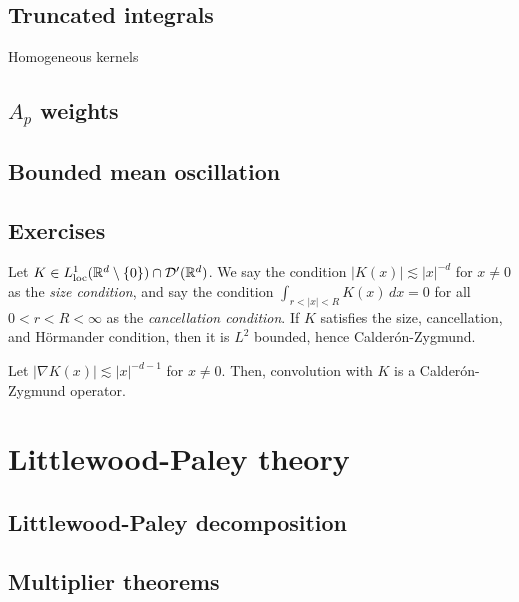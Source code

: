 \documentclass{../../large}
\begin{document}
\begin{prb}
\end{prb}


\section{Truncated integrals}

Homogeneous kernels

\section{$A_p$ weights}

\section{Bounded mean oscillation}


\section*{Exercises}
\begin{prb}
Let $K\in L_{\mathrm{loc}}^1(\mathbb{R}^d\setminus\{0\})\cap\mathcal{D}'(\mathbb{R}^d)$.
We say the condition $|K(x)|\lesssim|x|^{-d}$ for $x\ne0$ as the \emph{size condition}, and say the condition $\int_{r<|x|<R}K(x)\,dx=0$ for all $0<r<R<\infty$ as the \emph{cancellation condition}.
If $K$ satisfies the size, cancellation, and H\"ormander condition, then it is $L^2$ bounded, hence Calder\'on-Zygmund.
\end{prb}

\begin{prb}
Let $|\nabla K(x)|\lesssim|x|^{-d-1}$ for $x\ne0$.
Then, convolution with $K$ is a Calder\'on-Zygmund operator.
\end{prb}

\begin{prb}
\end{prb}



\chapter{Littlewood-Paley theory}
\section{Littlewood-Paley decomposition}
\section{Multiplier theorems}
\end{document}
